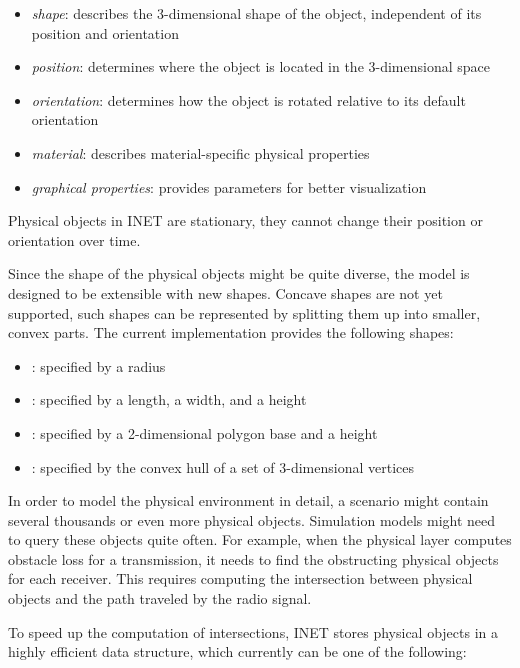 \begin{itemize}
  \item \textit{shape}: describes the 3-dimensional shape of the object,
    independent of its position and orientation
  \item \textit{position}: determines where the object is located in the 3-dimensional space
  \item \textit{orientation}: determines how the object is rotated relative to its
    default orientation
  \item \textit{material}: describes material-specific physical properties
  \item \textit{graphical properties}: provides parameters for better visualization
\end{itemize}

Physical objects in INET are stationary, they cannot change their position
or orientation over time.

Since the shape of the physical objects might be quite diverse, the model
is designed to be extensible with new shapes. Concave shapes are not yet
supported, such shapes can be represented by splitting them up into smaller,
convex parts. The current implementation provides the following shapes:

\begin{itemize}
  \item {}: specified by a radius
  \item {}: specified by a length, a width, and a height
  \item {}: specified by a 2-dimensional polygon base and a height
  \item {}: specified by the convex hull of a set of
    3-dimensional vertices
\end{itemize}

In order to model the physical environment in detail, a scenario might contain
several thousands or even more physical objects. Simulation models might
need to query these objects quite often. For example, when the physical layer
computes obstacle loss for a transmission, it needs to find the obstructing
physical objects for each receiver. This requires computing the intersection
between physical objects and the path traveled by the radio signal.

To speed up the computation of intersections, INET stores physical objects
in a highly efficient data structure, which currently can be one of the
following:

